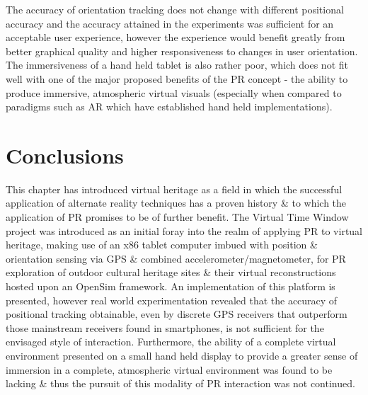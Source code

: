The accuracy of orientation tracking does not change with different positional accuracy and the accuracy attained in the experiments was sufficient for an acceptable user experience, however the experience would benefit greatly from better graphical quality and higher responsiveness to changes in user orientation. The immersiveness of a hand held tablet is also rather poor, which does not fit well with one of the major proposed benefits of the PR concept - the ability to produce immersive, atmospheric virtual visuals (especially when compared to paradigms such as AR which have established hand held implementations).


\section{Conclusions}

This chapter has introduced virtual heritage as a field in which the successful application of alternate reality techniques has a proven history \& to which the application of PR promises to be of further benefit. The Virtual Time Window project was introduced as an initial foray into the realm of applying PR to virtual heritage, making use of an x86 tablet computer imbued with position \& orientation sensing via GPS \& combined accelerometer/magnetometer, for PR exploration of outdoor cultural heritage sites \& their virtual reconstructions hosted upon an OpenSim framework. An implementation of this platform is presented, however real world experimentation revealed that the accuracy of positional tracking obtainable, even by discrete GPS receivers that outperform those mainstream receivers found in smartphones, is not sufficient for the envisaged style of interaction. Furthermore, the ability of a complete virtual environment presented on a small hand held display to provide a greater sense of immersion in a complete, atmospheric virtual environment was found to be lacking \& thus the pursuit of this modality of PR interaction was not continued.

